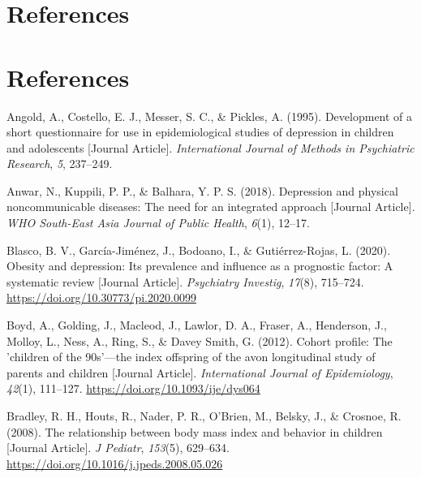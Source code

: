 \documentclass[
  letterpaper,
  DIV=11,
  numbers=noendperiod]{scrreport}
\newlength{\cslhangindent}
\newenvironment{CSLReferences}[2] %
 {\begin{list}{}{%
  \setlength{\itemindent}{0pt}
  \setlength{\leftmargin}{0pt}
  \setlength{\parsep}{0pt}
  \ifodd #1
   \setlength{\leftmargin}{\cslhangindent}
   \setlength{\itemindent}{-1\cslhangindent}
  \fi
  \setlength{\itemsep}{#2\baselineskip}}}
 {\end{list}}
\begin{document}
\section*{References}\label{references-5}


\section*{References}\label{bibliography--6}

\label{refs--6}
\begin{CSLReferences}{1}{0}
Angold, A., Costello, E. J., Messer, S. C., \& Pickles, A. (1995).
Development of a short questionnaire for use in epidemiological studies
of depression in children and adolescents {[}Journal Article{]}.
\emph{International Journal of Methods in Psychiatric Research},
\emph{5}, 237--249.

Anwar, N., Kuppili, P. P., \& Balhara, Y. P. S. (2018). Depression and
physical noncommunicable diseases: The need for an integrated approach
{[}Journal Article{]}. \emph{WHO South-East Asia Journal of Public
Health}, \emph{6}(1), 12--17.

Blasco, B. V., García-Jiménez, J., Bodoano, I., \& Gutiérrez-Rojas, L.
(2020). Obesity and depression: Its prevalence and influence as a
prognostic factor: A systematic review {[}Journal Article{]}.
\emph{Psychiatry Investig}, \emph{17}(8), 715--724.
\url{https://doi.org/10.30773/pi.2020.0099}

Boyd, A., Golding, J., Macleod, J., Lawlor, D. A., Fraser, A.,
Henderson, J., Molloy, L., Ness, A., Ring, S., \& Davey Smith, G.
(2012). Cohort profile: The 'children of the 90s'---the index offspring
of the avon longitudinal study of parents and children {[}Journal
Article{]}. \emph{International Journal of Epidemiology}, \emph{42}(1),
111--127. \url{https://doi.org/10.1093/ije/dys064}

Bradley, R. H., Houts, R., Nader, P. R., O'Brien, M., Belsky, J., \&
Crosnoe, R. (2008). The relationship between body mass index and
behavior in children {[}Journal Article{]}. \emph{J Pediatr},
\emph{153}(5), 629--634.
\url{https://doi.org/10.1016/j.jpeds.2008.05.026}


\end{CSLReferences}
\end{document}
